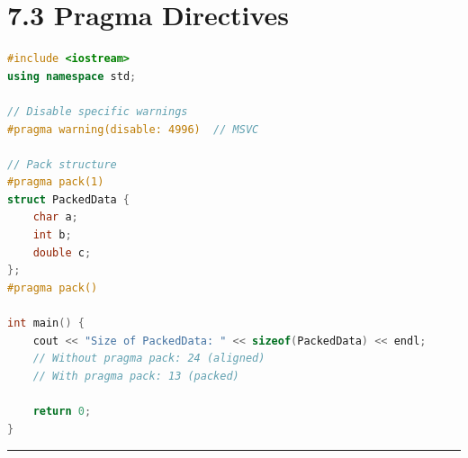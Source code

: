 \hypertarget{pragma-directives}{%
\section{7.3 Pragma Directives}\label{pragma-directives}}

\begin{lstlisting}[language={C++}]
#include <iostream>
using namespace std;

// Disable specific warnings
#pragma warning(disable: 4996)  // MSVC

// Pack structure
#pragma pack(1)
struct PackedData {
    char a;
    int b;
    double c;
};
#pragma pack()

int main() {
    cout << "Size of PackedData: " << sizeof(PackedData) << endl;
    // Without pragma pack: 24 (aligned)
    // With pragma pack: 13 (packed)
    
    return 0;
}
\end{lstlisting}

\begin{center}\rule{0.5\linewidth}{0.5pt}\end{center}

